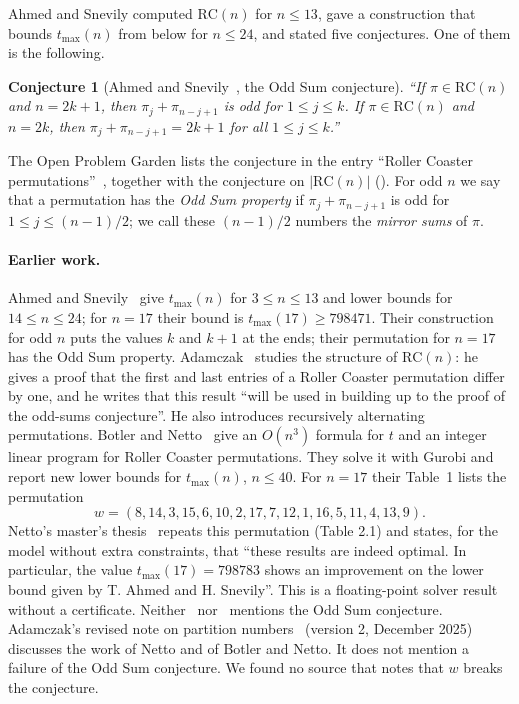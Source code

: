 \documentclass[11pt]{article}
\newtheorem{conjecture}[theorem]{Conjecture}
\theoremstyle{remark}
\newcommand{\RC}{\mathrm{RC}}
\newcommand{\tmax}{t_{\max}}
\begin{document}
Ahmed and Snevily computed $\RC(n)$ for $n \le 13$, gave a construction that bounds $\tmax(n)$ from below for $n \le 24$, and stated five conjectures. One of them is the following.

\begin{conjecture}[Ahmed and Snevily~{\cite[Conjecture 2.4]{AS}}, the Odd Sum conjecture]\label{conj:oddsum}
``If $\pi \in \RC(n)$ and $n = 2k + 1$, then $\pi_j + \pi_{n-j+1}$ is odd for $1 \le j \le k$. If $\pi \in \RC(n)$ and $n = 2k$, then $\pi_j + \pi_{n-j+1} = 2k + 1$ for all $1 \le j \le k$.''
\end{conjecture}

The Open Problem Garden lists the conjecture in the entry ``Roller Coaster permutations''~\cite{OPG}, together with the conjecture on $|\RC(n)|$ (\cite[Conjecture 2.3]{AS}). For odd $n$ we say that a permutation has the \emph{Odd Sum property} if $\pi_j + \pi_{n-j+1}$ is odd for $1 \le j \le (n-1)/2$; we call these $(n-1)/2$ numbers the \emph{mirror sums} of $\pi$.

\paragraph{Earlier work.}
Ahmed and Snevily~\cite{AS} give $\tmax(n)$ for $3 \le n \le 13$ and lower bounds for $14 \le n \le 24$; for $n = 17$ their bound is $\tmax(17) \ge 798471$. Their construction for odd $n$ puts the values $k$ and $k+1$ at the ends; their permutation for $n = 17$ has the Odd Sum property. Adamczak~\cite{Ad1} studies the structure of $\RC(n)$: he gives a proof that the first and last entries of a Roller Coaster permutation differ by one, and he writes that this result ``will be used in building up to the proof of the odd-sums conjecture''. He also introduces recursively alternating permutations. Botler and Netto~\cite{BN} give an $O(n^3)$ formula for $t$ and an integer linear program for Roller Coaster permutations. They solve it with Gurobi and report new lower bounds for $\tmax(n)$, $n \le 40$. For $n = 17$ their Table~1 lists the permutation
\[
  w = (8, 14, 3, 15, 6, 10, 2, 17, 7, 12, 1, 16, 5, 11, 4, 13, 9).
\]
Netto's master's thesis~\cite{Netto} repeats this permutation (Table 2.1) and states, for the model without extra constraints, that ``these results are indeed optimal. In particular, the value $\tmax(17) = 798783$ shows an improvement on the lower bound given by T. Ahmed and H. Snevily''. This is a floating-point solver result without a certificate. Neither~\cite{BN} nor~\cite{Netto} mentions the Odd Sum conjecture. Adamczak's revised note on partition numbers~\cite{Ad2} (version 2, December 2025) discusses the work of Netto and of Botler and Netto. It does not mention a failure of the Odd Sum conjecture. We found no source that notes that $w$ breaks the conjecture.
\end{document}
